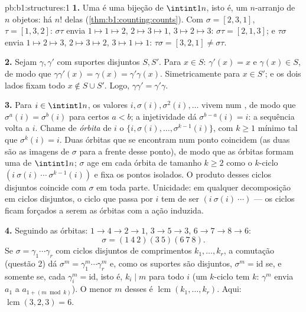 \begin{solution}{pb:b1:structures:1}
\textbf{1.} Uma  é uma bijeção de $\intint1n$, isto é, um
$n$-arranjo de $n$ objetos: há $n!$ delas
(\cref{thm:b1:counting:counts}). Com $\sigma = [2,3,1]$, $\tau =
[1,3,2]$: $\sigma\tau$ envia $1 \mapsto 1 \mapsto 2$, $2 \mapsto 3
\mapsto 1$, $3 \mapsto 2 \mapsto 3$: $\sigma\tau = [2,1,3]$; e
$\tau\sigma$ envia $1 \mapsto 2 \mapsto 3$, $2 \mapsto 3 \mapsto
2$, $3 \mapsto 1 \mapsto 1$: $\tau\sigma = [3,2,1] \neq
\sigma\tau$.

\textbf{2.} Sejam $\gamma, \gamma'$ com suportes disjuntos $S, S'$.
Para $x \in S$: $\gamma'(x) = x$ e $\gamma(x) \in S$, de modo que
$\gamma\gamma'(x) = \gamma(x) = \gamma'\gamma(x)$. Simetricamente
para $x \in S'$; e os dois lados fixam todo $x \notin S \cup S'$. Logo,
$\gamma\gamma' = \gamma'\gamma$.

\textbf{3.} Para $i \in \intint1n$, os valores $i, \sigma(i),
\sigma^2(i), \dots$ vivem num , de modo que $\sigma^a(i) =
\sigma^b(i)$ para certos $a < b$; a injetividade dá $\sigma^{b-a}(i)
= i$: a sequência volta a $i$. Chame de \emph{órbita} de $i$ o
 $\{i, \sigma(i), \dots, \sigma^{k-1}(i)\}$, com $k \geq 1$
mínimo tal que $\sigma^k(i) = i$. Duas órbitas que se encontram num
ponto coincidem (as duas são as imagens de $\sigma$ para a frente desse
ponto), de modo que as órbitas formam uma  de $\intint1n$; $\sigma$
age em cada órbita de tamanho $k \geq 2$ como o $k$-ciclo $(i\ \sigma(i)\ \cdots\
\sigma^{k-1}(i))$ e fixa os pontos isolados. O produto desses
ciclos disjuntos coincide com $\sigma$ em toda parte. Unicidade: em
qualquer decomposição em ciclos disjuntos, o ciclo que passa por $i$ tem
de ser $(i\ \sigma(i)\ \cdots)$ --- os ciclos ficam forçados a serem as
órbitas com a ação induzida.

\textbf{4.} Seguindo as órbitas: $1 \to 4 \to 2 \to 1$, $3 \to 5
\to 3$, $6 \to 7 \to 8 \to 6$:
\[
\sigma = (1\ 4\ 2)(3\ 5)(6\ 7\ 8) .
\]
Se $\sigma = \gamma_1\cdots\gamma_r$ com ciclos disjuntos de
comprimentos $k_1, \dots, k_r$, a comutação (questão 2) dá
$\sigma^m = \gamma_1^m\cdots\gamma_r^m$ e, como os suportes
são disjuntos, $\sigma^m = \mathrm{id}$ se, e somente se, cada $\gamma_i^m =
\mathrm{id}$, isto é, $k_i \mid m$ para todo $i$ (um $k$-ciclo tem 
$k$: $\gamma^m$ envia $a_1$ a $a_{1 + (m \bmod k)}$). O menor
$m$ desses é $\operatorname{lcm}(k_1, \dots, k_r)$. Aqui:
$\operatorname{lcm}(3, 2, 3) = 6$.


\end{solution}
